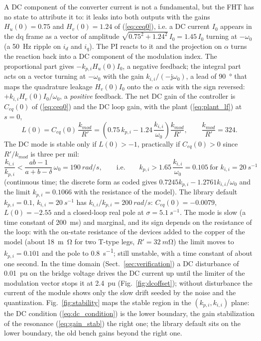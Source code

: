 \documentclass[10pt,a4paper]{scrartcl}
\newcommand{\wo}{\omega_0}
\newcommand{\kmod}{k_{mod}}
\newcommand{\kpi}{k_{p,i}}
\newcommand{\kii}{k_{i,i}}
\newcommand{\jj}{\mathrm{j}}
\newcommand{\Ceq}{C_{eq}}
\newcommand{\Hu}{H_u}
\newcommand{\Hv}{H_v}
\begin{document}
\begin{onehalfspace}
A DC component of the converter current is not a fundamental, but the FHT has no state to attribute it to: it leaks into both outputs with the gains $\Hu(0) = 0.75$ and $\Hv(0) = 1.24$ of (\ref{eq:ceq0}), i.e. a DC current $I_0$ appears in the dq frame as a vector of amplitude $\sqrt{0.75^2 + 1.24^2}\,I_0 = 1.45\,I_0$ turning at $-\wo$ (a \SI{50}{Hz} ripple on $i_d$ and $i_q$). The PI reacts to it and the projection on $\alpha$ turns the reaction back into a DC component of the modulation index. The proportional part gives $-\kpi\Hu(0)I_0$, a negative feedback; the integral part acts on a vector turning at $-\wo$ with the gain $\kii/(-\jj\wo)$, a lead of \SI{90}{\degree} that maps the quadrature leakage $\Hv(0)I_0$ onto the $\alpha$ axis with the sign reversed: $+\kii\Hv(0)I_0/\wo$, a \emph{positive} feedback. The net DC gain of the controller is $\Ceq(0)$ of (\ref{eq:ceq0}) and the DC loop gain, with the plant (\ref{eq:plant_lf}) at $s = 0$,
\begin{equation}
L(0) = \Ceq(0)\,\frac{\kmod}{R'} = \left(0.75\,\kpi - 1.24\,\frac{\kii}{\wo}\right)\frac{\kmod}{R'}, \qquad \frac{\kmod}{R'} = 324 .
\label{eq:L0}
\end{equation}
The DC mode is stable only if $L(0) > -1$, practically if $\Ceq(0) > 0$ since $R'/\kmod$ is three per mil:
\begin{equation}
\frac{\kii}{\kpi} < \frac{ab - 1}{a + b - \delta}\,\wo = \SI{190}{rad/s}, \qquad\text{i.e.}\qquad \kpi > 1.65\,\frac{\kii}{\wo} = 0.105 \ \text{for } \kii = \SI{20}{s^{-1}}
\label{eq:dc_condition}
\end{equation}
(continuous time; the discrete form as coded gives $0.7245\kpi - 1.2761\kii/\wo$ and the limit $\kpi = 0.1066$ with the resistance of the model). The library default $\kpi = 0.1$, $\kii = \SI{20}{s^{-1}}$ has $\kii/\kpi = \SI{200}{rad/s}$: $\Ceq(0) = -0.0079$, $L(0) = -2.55$ and a closed-loop real pole at $\sigma = \SI{+5.1}{s^{-1}}$. The mode is slow (a time constant of \SI{200}{ms}) and marginal, and its sign depends on the resistance of the loop: with the on-state resistance of the devices added to the copper of the model (about \SI{18}{m\ohm} for two T-type legs, $R' = \SI{32}{m\ohm}$) the limit moves to $\kpi = 0.101$ and the pole to \SI{+0.8}{s^{-1}}; still unstable, with a time constant of about one second. In the time domain (Sect.~\ref{sec:verification}) a DC disturbance of \SI{0.01}{pu} on the bridge voltage drives the DC current up until the limiter of the modulation vector stops it at \SI{2.4}{pu} (Fig.~\ref{fig:dcoffset}); without disturbance the current of the module shows only the slow drift seeded by the noise and the quantization. Fig.~\ref{fig:stability} maps the stable region in the $(\kpi, \kii)$ plane: the DC condition (\ref{eq:dc_condition}) is the lower boundary, the gain stabilization of the resonance (\ref{eq:gain_stab}) the right one; the library default sits on the lower boundary, the old bench gains beyond the right one.


\end{onehalfspace}
\end{document}

